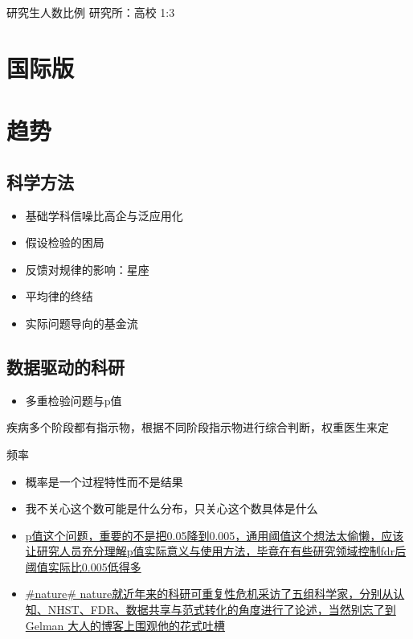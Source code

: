 \documentclass[]{book}
\providecommand{\tightlist}{%
  \setlength{\itemsep}{0pt}\setlength{\parskip}{0pt}}
\begin{document}
研究生人数比例 研究所：高校 1:3

\section{国际版}

\section{趋势}

\subsection{科学方法}

\begin{itemize}
\tightlist
\item
  基础学科信噪比高企与泛应用化
\item
  假设检验的困局
\item
  反馈对规律的影响：星座
\item
  平均律的终结
\item
  实际问题导向的基金流
\end{itemize}

\subsection{数据驱动的科研}

\begin{itemize}
\tightlist
\item
  多重检验问题与p值
\end{itemize}

疾病多个阶段都有指示物，根据不同阶段指示物进行综合判断，权重医生来定

频率

\begin{itemize}
\tightlist
\item
  概率是一个过程特性而不是结果
\item
  我不关心这个数可能是什么分布，只关心这个数具体是什么
\item
  \href{http://www.nature.com/news/one-size-fits-all-threshold-for-p-values-under-fire-1.22625}{p值这个问题，重要的不是把0.05降到0.005，通用阈值这个想法太偷懒，应该让研究人员充分理解p值实际意义与使用方法，毕竟在有些研究领域控制fdr后阈值实际比0.005低得多}
\item
  \href{https://www.nature.com/articles/d41586-017-07522-z}{\#nature\#
  nature就近年来的科研可重复性危机采访了五组科学家，分别从认知、NHST、FDR、数据共享与范式转化的角度进行了论述，当然别忘了到
  Gelman 大人的博客上围观他的花式吐槽}
\end{itemize}
\end{document}
